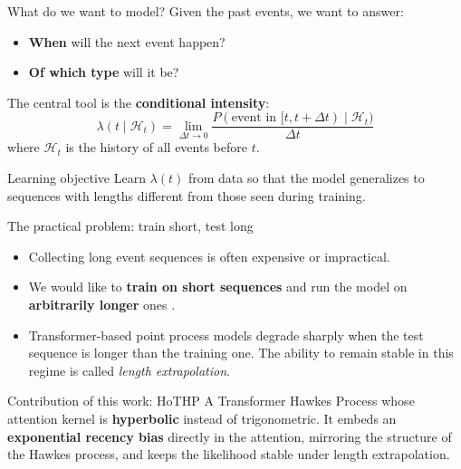 \documentclass[aspectratio=169]{beamer}
\begin{document}
\begin{frame}{What do we want to model?}
  Given the past events, we want to answer:
  \begin{itemize}
    \item \textbf{When} will the next event happen?
    \item \textbf{Of which type} will it be?
  \end{itemize}
  \vspace{0.5em}
  The central tool is the \textbf{conditional intensity}:
  \[
    \lambda(t \mid \mathcal{H}_t) = \lim_{\Delta t \to 0}
      \frac{P(\text{event in } [t, t+\Delta t) \mid \mathcal{H}_t)}{\Delta t}
  \]
  where $\mathcal{H}_t$ is the history of all events before $t$.
  \vspace{0.5em}
  \begin{block}{Learning objective}
    Learn $\lambda(t)$ from data so that the model generalizes to sequences
    with lengths different from those seen during training.
  \end{block}
\end{frame}

\begin{frame}{The practical problem: train short, test long}
  \begin{itemize}
    \item Collecting long event sequences is often expensive or impractical.
    \item We would like to \textbf{train on short sequences} and run the model on
          \textbf{arbitrarily longer} ones \cite{press2022train}.
    \item Transformer-based point process models degrade sharply when the test
          sequence is longer than the training one. The ability to remain stable
          in this regime is called \emph{length extrapolation}.
  \end{itemize}
  \vspace{0.6em}
  \begin{block}{Contribution of this work: HoTHP}
    A Transformer Hawkes Process whose attention kernel is \textbf{hyperbolic}
    instead of trigonometric. It embeds an \textbf{exponential recency bias}
    directly in the attention, mirroring the structure of the Hawkes process, and
    keeps the likelihood stable under length extrapolation.
  \end{block}
\end{frame}
\end{document}
